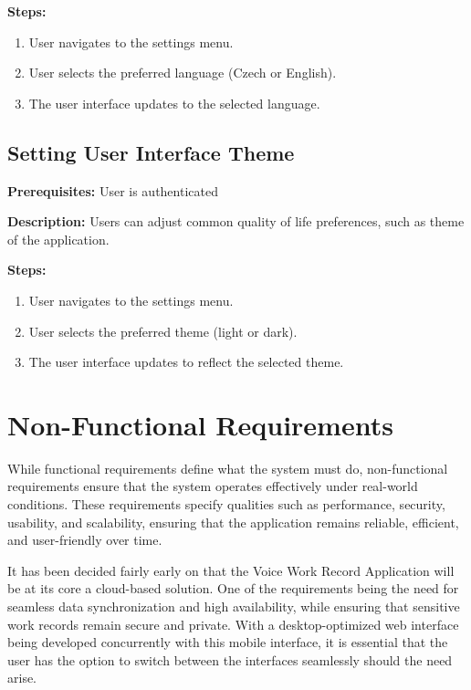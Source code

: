 \documentclass[
  digital,     %
  oneside,     %
  nosansbold,  %
  nocolorbold, %
  lof,         %
  lot,         %
]{fithesis4}
\begin{document}
\noindent \textbf{Steps:}
\begin{enumerate}
    \item User navigates to the settings menu.
    \item User selects the preferred language (Czech or English).
    \item The user interface updates to the selected language.
\end{enumerate}

\subsection{Setting User Interface Theme}

\noindent \textbf{Prerequisites:} User is authenticated

\noindent \textbf{Description:}  
Users can adjust common quality of life preferences, such as theme of the application.

\noindent \textbf{Steps:}
\begin{enumerate}
    \item User navigates to the settings menu.
    \item User selects the preferred theme (light or dark).
    \item The user interface updates to reflect the selected theme.
\end{enumerate}

\section{Non-Functional Requirements}

While functional requirements define what the system must do, non-functional requirements ensure that the system operates effectively under real-world conditions. These requirements specify qualities such as performance, security, usability, and scalability, ensuring that the application remains reliable, efficient, and user-friendly over time.  

It has been decided fairly early on that the Voice Work Record Application will be at its core a cloud-based solution. One of the requirements being the need for seamless data synchronization and high availability, while ensuring that sensitive work records remain secure and private. With a desktop-optimized web interface being developed concurrently with this mobile interface, it is essential that the user has the option to switch between the interfaces seamlessly should the need arise.
\end{document}
